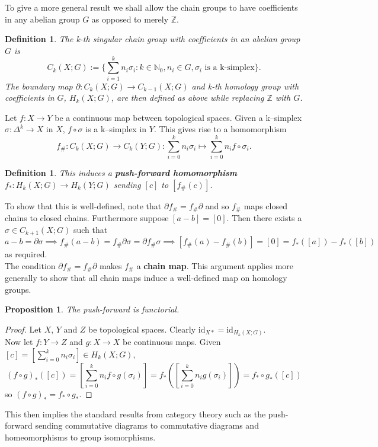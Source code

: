 \documentclass{article}
\newtheorem{definition}[theorem]{Definition}
\newtheorem{proposition}[theorem]{Proposition}
\begin{document}
\noindent To give a more general result we shall allow the chain groups to have coefficients in any abelian group $G$ as opposed to merely $\mathbb{Z}$.
\begin{definition}
The k-th singular chain group with coefficients in an abelian group $G$ is \[C_k(X;G):=\{\sum_{i=1}^kn_i\sigma_i:k\in\mathbb{N}_0,n_i\in G,\sigma_i \text{ is a k-simplex}\}.\] The boundary map $\partial\colon C_k(X;G)\to C_{k-1}(X;G)$ and k-th homology group with coefficients in $G$, $H_k(X;G)$, are then defined as above while replacing $\mathbb{Z}$ with $G$.
\end{definition}

\noindent Let $f\colon X\to Y$ be a continuous map between topological spaces. Given a k--simplex $\sigma\colon\Delta^k\to X$ in $X$, $f\circ\sigma$ is a k--simplex in $Y$. This gives rise to a homomorphism \[f_\#\colon C_k(X;G)\to C_k(Y;G):\sum_{i=0}^kn_i\sigma_i\mapsto\sum_{i=0}^kn_if\circ\sigma_i.\]
\begin{definition}
This induces a \textbf{push-forward homomorphism} $f_*\colon H_k(X;G)\to H_k(Y;G)$ sending $[c]$ to $[f_\#(c)]$.
\end{definition}
\noindent To show that this is well-defined, note that $\partial f_\#=f_\#\partial$ and so $f_\#$ maps closed chains to closed chains. Furthermore suppose $[a-b]=[0]$. Then there exists a $\sigma\in C_{k+1}(X;G)$ such that \[a-b=\partial\sigma\implies f_\#(a-b)=f_\#\partial\sigma=\partial f_\#\sigma\implies [f_\#(a)-f_\#(b)]=[0]=f_*([a])-f_*([b])\] as required.\\

\noindent The condition $\partial f_\#=f_\#\partial$ makes $f_\#$ a \textbf{chain map}. This argument applies more generally to show that all chain maps induce a well-defined map on homology groups.

\begin{proposition}
The push-forward is functorial.
\end{proposition}
\begin{proof}
Let $X$, $Y$ and $Z$ be topological spaces.
Clearly $\text{id}_{X*}=\text{id}_{H_k(X;G)}$.\\
Now let $f\colon Y\to Z$ and $g\colon X\to X$ be continuous maps. Given $[c]=[\sum_{i=0}^kn_i\sigma_i]\in H_k(X;G)$, \[(f\circ g)_*([c])=[\sum_{i=0}^kn_if\circ g(\sigma_i)]=f_*([\sum_{i=0}^kn_ig(\sigma_i)])=f_*\circ g_*([c])\] so $(f\circ g)_*=f_*\circ g_*$.
\end{proof}

\noindent This then implies the standard results from category theory such as the push-forward sending commutative diagrams to commutative diagrams and homeomorphisms to group isomorphisms.
\end{document}
